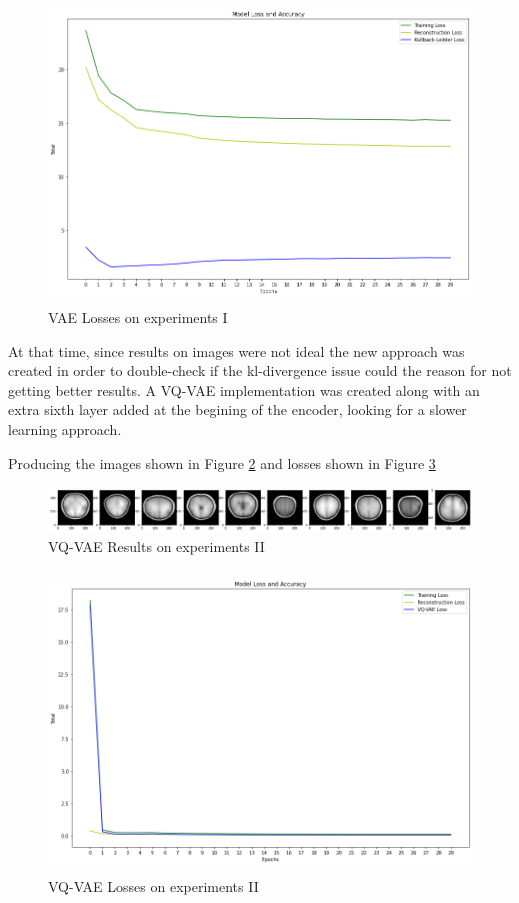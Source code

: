 \begin{figure}[ht]
    \centering
    \includegraphics[width = 14cm, height=8cm]{images/vae-k3-loss-30-epochs.png}
    \caption[]{VAE Losses on experiments I}
    \label{fig:vae-k3-loss-30-epochs}
\end{figure}

At that time, since results on images were not ideal the new approach was created in order to double-check if the kl-divergence issue could the reason for not getting better results. A VQ-VAE implementation was created along with an extra sixth layer added at the begining of the encoder, looking for a slower learning approach.

Producing the images shown in Figure \ref*{fig:vqvae-6layers-30-epochs} and losses shown in Figure \ref*{fig:vqvae-6layers-loss-30-epochs}

\begin{figure}[ht]
    \centering
    \includegraphics[width = 17cm]{images/vqvae-6layers-30-epochs.png}
    \caption[]{VQ-VAE Results on experiments II}
    \label{fig:vqvae-6layers-30-epochs}
\end{figure}

\begin{figure}[ht]
    \centering
    \includegraphics[width = 14cm, height=8cm]{images/vqvae-6layers-loss-30-epochs.png}
    \caption[]{VQ-VAE Losses on experiments II}
    \label{fig:vqvae-6layers-loss-30-epochs}
\end{figure}

